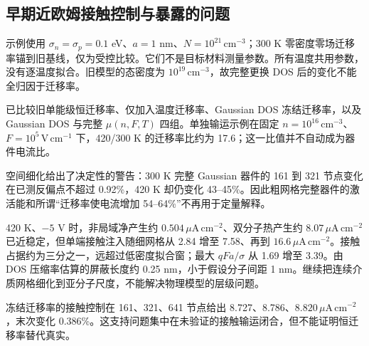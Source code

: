 \documentclass[11pt,a4paper]{article}
\begin{document}
\subsection{{\cjkfont 早期近欧姆接触控制与暴露的问题}\allowbreak{}}
{\cjkfont 示例使用}\allowbreak{} $\sigma_n=\sigma_p=0.1$ eV{\cjkfont 、}\allowbreak{}$a=1$ nm{\cjkfont 、}\allowbreak{}$N=10^{21}\,\mathrm{cm^{-3}}${\cjkfont ；}\allowbreak{}300 K {\cjkfont 零密度零场迁移率锚到旧基线，仅为受控比较。它们不是目标材料测量参数。所有温度共用参数，没有逐温度拟合。旧模型的态密度为}\allowbreak{} $10^{19}\,\mathrm{cm^{-3}}${\cjkfont ，故完整更换}\allowbreak{} DOS {\cjkfont 后的变化不能全归因于迁移率。}\allowbreak{}

{\cjkfont 已比较旧单能级恒迁移率、仅加入温度迁移率、}\allowbreak{}Gaussian DOS {\cjkfont 冻结迁移率，以及}\allowbreak{} Gaussian DOS {\cjkfont 与完整}\allowbreak{} $\mu(n,F,T)$ {\cjkfont 四组。单独输运示例在固定}\allowbreak{} $n=10^{16}\,\mathrm{cm^{-3}}${\cjkfont 、}\allowbreak{}$F=10^5\,\mathrm{V\,cm^{-1}}$ {\cjkfont 下，}\allowbreak{}420/300 K {\cjkfont 的迁移率比约为}\allowbreak{} 17.6{\cjkfont ；这一比值并不自动成为器件电流比。}\allowbreak{}

{\cjkfont 空间细化给出了决定性的警告：}\allowbreak{}300 K {\cjkfont 完整}\allowbreak{} Gaussian {\cjkfont 器件的}\allowbreak{} 161 {\cjkfont 到}\allowbreak{} 321 {\cjkfont 节点变化在已测反偏点不超过}\allowbreak{} 0.92\%{\cjkfont ，}\allowbreak{}420 K {\cjkfont 却仍变化}\allowbreak{} 43--45\%{\cjkfont 。因此粗网格完整器件的激活能和所谓}\allowbreak{}“{\cjkfont 迁移率使电流增加}\allowbreak{} 54--64\%”{\cjkfont 不再用于定量解释。}\allowbreak{}

420 K{\cjkfont 、}\allowbreak{}$-5$ V {\cjkfont 时，非局域净产生约}\allowbreak{} $0.504\,\mu\mathrm{A\,cm^{-2}}${\cjkfont 、双分子热产生约}\allowbreak{} $8.07\,\mu\mathrm{A\,cm^{-2}}$ {\cjkfont 已近稳定，但单端接触注入随细网格从}\allowbreak{} 2.84 {\cjkfont 增至}\allowbreak{} 7.58{\cjkfont 、再到}\allowbreak{} $16.6\,\mu\mathrm{A\,cm^{-2}}${\cjkfont 。接触占据约为三分之一，远超过低密度拟合窗；最大}\allowbreak{} $qFa/\sigma$ {\cjkfont 从}\allowbreak{} 1.69 {\cjkfont 增至}\allowbreak{} 3.39{\cjkfont 。由}\allowbreak{} DOS {\cjkfont 压缩率估算的屏蔽长度约}\allowbreak{} 0.25 nm{\cjkfont ，小于假设分子间距}\allowbreak{} 1 nm{\cjkfont 。继续把连续介质网格细化到亚分子尺度，不能解决物理模型的层级问题。}\allowbreak{}

{\cjkfont 冻结迁移率的接触控制在}\allowbreak{} 161{\cjkfont 、}\allowbreak{}321{\cjkfont 、}\allowbreak{}641 {\cjkfont 节点给出}\allowbreak{} 8.727{\cjkfont 、}\allowbreak{}8.786{\cjkfont 、}\allowbreak{}$8.820\,\mu\mathrm{A\,cm^{-2}}${\cjkfont ，末次变化}\allowbreak{} 0.386\%{\cjkfont 。这支持问题集中在未验证的接触输运闭合，但不能证明恒迁移率替代真实。}\allowbreak{}
\end{document}
